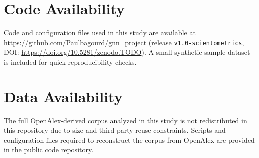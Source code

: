 \documentclass[pdflatex,sn-basic]{sn-jnl}
\begin{document}
\section*{Code Availability}
Code and configuration files used in this study are available at \url{https://github.com/Paulbagourd/gnn_project} (release \texttt{v1.0-scientometrics}, DOI: \url{https://doi.org/10.5281/zenodo.TODO}). A small synthetic sample dataset is included for quick reproducibility checks.

\section*{Data Availability}
The full OpenAlex-derived corpus analyzed in this study is not redistributed in this repository due to size and third-party reuse constraints. Scripts and configuration files required to reconstruct the corpus from OpenAlex are provided in the public code repository.
\end{document}
